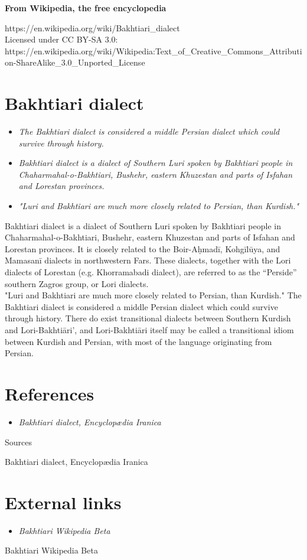 \textbf{From Wikipedia, the free encyclopedia}

https://en.wikipedia.org/wiki/Bakhtiari\_dialect\\
Licensed under CC BY-SA 3.0:\\
https://en.wikipedia.org/wiki/Wikipedia:Text\_of\_Creative\_Commons\_Attribution-ShareAlike\_3.0\_Unported\_License

\section{Bakhtiari dialect}\label{bakhtiari-dialect}

\begin{itemize}
\item
  \emph{The Bakhtiari dialect is considered a middle Persian dialect
  which could survive through history.}
\item
  \emph{Bakhtiari dialect is a dialect of Southern Luri spoken by
  Bakhtiari people in Chaharmahal-o-Bakhtiari, Bushehr, eastern
  Khuzestan and parts of Isfahan and Lorestan provinces.}
\item
  \emph{"Luri and Bakhtiari are much more closely related to Persian,
  than Kurdish."}
\end{itemize}

Bakhtiari dialect is a dialect of Southern Luri spoken by Bakhtiari
people in Chaharmahal-o-Bakhtiari, Bushehr, eastern Khuzestan and parts
of Isfahan and Lorestan provinces. It is closely related to the
Boir-Aḥmadī, Kohgīlūya, and Mamasanī dialects in northwestern Fars.
These dialects, together with the Lori dialects of Lorestan (e.g.
Khorramabadi dialect), are referred to as the ``Perside'' southern
Zagros group, or Lori dialects.\\[2\baselineskip]"Luri and Bakhtiari are
much more closely related to Persian, than Kurdish." The Bakhtiari
dialect is considered a middle Persian dialect which could survive
through history. There do exist transitional dialects between Southern
Kurdish and Lori-Bakhtiāri', and Lori-Bakhtiāri itself may be called a
transitional idiom between Kurdish and Persian, with most of the
language originating from Persian.

\section{References}\label{references}

\begin{itemize}
\item
  \emph{Bakhtiari dialect, Encyclopædia Iranica}
\end{itemize}

Sources

Bakhtiari dialect, Encyclopædia Iranica

\section{External links}\label{external-links}

\begin{itemize}
\item
  \emph{Bakhtiari Wikipedia Beta}
\end{itemize}

Bakhtiari Wikipedia Beta
